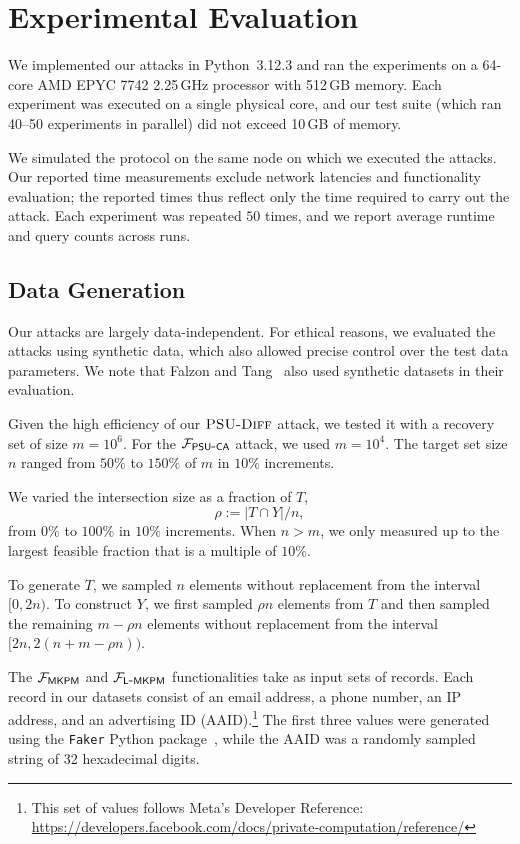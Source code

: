 \section{Experimental Evaluation}\label{sec:evaluation}

We implemented our attacks in Python~3.12.3 and ran the experiments on a 64-core AMD EPYC 7742 2.25\,GHz processor with 512\,GB memory. Each experiment was executed on a single physical core, and our test suite (which ran 40–50 experiments in parallel) did not exceed 10\,GB of memory.

We simulated the protocol on the same node on which we executed the attacks. Our reported time measurements exclude network latencies and functionality evaluation; the reported times thus reflect only the time required to carry out the attack. Each experiment was repeated $50$ times, and we report average runtime and query counts across runs.

\subsection{Data Generation} 

Our attacks are largely data-independent. For ethical reasons, we evaluated the attacks using synthetic data, which also allowed precise control over the test data parameters. We note that Falzon and Tang~\cite{USENIX:FalTan25} also used synthetic datasets in their evaluation.


 Given the high efficiency of our ${\textsc{PSU\mbox{-}Diff}}$ attack, we tested it with a recovery set of size $m = 10^6$. For the $\mathcal{F}_{\mathsf{PSU\mbox{-}CA}}$ attack, we used $m = 10^4$.
The target set size $n$ ranged from $50\%$ to $150\%$ of $m$ in $10\%$ increments.

We varied the intersection size as a fraction of $T$,
\[
    \rho := |T \cap Y| / n,
\]
from $0\%$ to $100\%$ in $10\%$ increments. When $n > m$, we only measured up to the largest feasible fraction that is a multiple of $10\%$.

To generate $T$, we sampled $n$ elements without replacement from the interval $[0, 2n)$. To construct $Y$, we first sampled $\rho n$ elements from $T$ and then sampled the remaining $m - \rho n$ elements without replacement from the interval $[2n, 2(n + m - \rho n))$.


The $\mathcal{F}_{\mathsf{MKPM}}$ and $\mathcal{F}_{\mathsf{L\mbox{-}MKPM}}$ functionalities take as input sets of records. Each record in our datasets consist of an email address, a phone number, an IP address, and an advertising ID (AAID).\footnote{This set of values follows Meta's Developer Reference: \url{https://developers.facebook.com/docs/private-computation/reference/}} The first three values were generated using the \texttt{Faker} Python package~\cite{faker}, while the AAID was a randomly sampled string of 32 hexadecimal digits.

